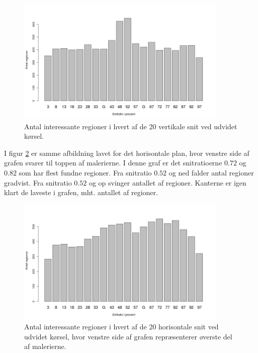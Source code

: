 {\begin{figure}[h!]
	\begin{center}
		\includegraphics[width=0.9\textwidth]{afsnit/resultater/billeder/cut0cut1eatsperratioU.png}
	\end{center}
	\caption{Antal interessante regioner i hvert af de 20 vertikale snit
	ved udvidet kørsel.}
	\label{antal_regioner_vertikale_cut_udvidet}
\end{figure}

I figur \ref{antal_regioner_horisontale_cut_udvidet} er samme afbildning
lavet for det horisontale plan, hvor venstre side af grafen svarer til
toppen af malerierne. I denne graf er det snitratioerne $0.72$ og $0.82$
som har flest fundne regioner. Fra snitratio $0.52$ og ned falder antal
regioner gradvist. Fra snitratio $0.52$ og op svinger antallet af
regioner. Kanterne er igen klart de laveste i grafen, mht. antallet af
regioner.

\begin{figure}[h!]
	\begin{center}
		\includegraphics[width=0.9\textwidth]{afsnit/resultater/billeder/cut2cut3eatsperratioU.png}
	\end{center}
    \caption{Antal interessante regioner i hvert af de 20 horisontale
    snit ved udvidet kørsel, hvor venstre side af grafen repræsenterer
    øverste del af malerierne.}
    \label{antal_regioner_horisontale_cut_udvidet}
\end{figure}

}
